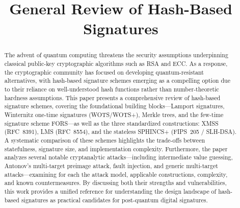 \documentclass[version=preprint]{iacrcc}
\title[running  = {General Review of Hash-Based Signatures},
       subtitle = {}
      ]{General Review of Hash-Based Signatures}
\begin{document}
\maketitle



\begin{abstract}
  The advent of quantum computing threatens the security assumptions underpinning classical public-key cryptographic algorithms such as RSA and ECC. As a response, the cryptographic community has focused on developing quantum-resistant alternatives, with hash-based signature schemes emerging as a compelling option due to their reliance on well-understood hash functions rather than number-theoretic hardness assumptions. This paper presents a comprehensive review of hash-based signature schemes, covering the foundational building blocks---Lamport signatures, Winternitz one-time signatures (WOTS/WOTS+), Merkle trees, and the few-time signature scheme FORS---as well as the three standardized constructions: XMSS (RFC~8391), LMS (RFC~8554), and the stateless SPHINCS+ (FIPS~205 / SLH-DSA). A systematic comparison of these schemes highlights the trade-offs between statefulness, signature size, and implementation complexity. Furthermore, the paper analyzes several notable cryptanalytic attacks---including intermediate value guessing, Antonov's multi-target preimage attack, fault injection, and generic multi-target attacks---examining for each the attack model, applicable constructions, complexity, and known countermeasures. By discussing both their strengths and vulnerabilities, this work provides a unified reference for understanding the design landscape of hash-based signatures as practical candidates for post-quantum digital signatures.
\end{abstract}
\end{document}
